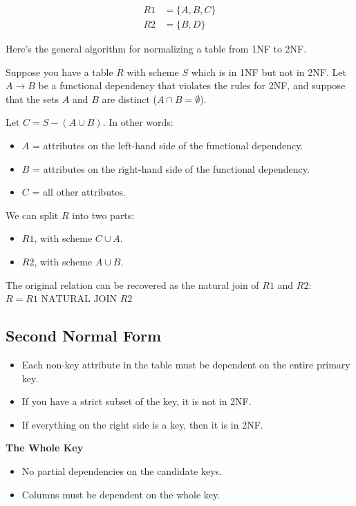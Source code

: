 \documentclass{article}
\begin{document}
\begin{align*}
    R1 & = \{A, B, C\} \\
    R2 & = \{B, D\}
\end{align*}

Here's the general algorithm for normalizing a table from 1NF to 2NF.

Suppose you have a table $R$ with scheme $S$ which is in 1NF but not in 2NF.
Let $A \rightarrow B$ be a functional dependency that violates the rules for
2NF, and suppose that the sets $A$ and $B$ are distinct ($A \cap B =
    \emptyset$).

Let $C = S - (A \cup B)$. In other words:
\begin{itemize}
    \item $A$ = attributes on the left-hand side of the functional dependency.
    \item $B$ = attributes on the right-hand side of the functional dependency.
    \item $C$ = all other attributes.
\end{itemize}

We can split $R$ into two parts:
\begin{itemize}
    \item $R1$, with scheme $C \cup A$.
    \item $R2$, with scheme $A \cup B$.
\end{itemize}

The original relation can be recovered as the natural join of $R1$ and $R2$: $R
    = R1 \text{ NATURAL JOIN } R2$

\subsection{Second Normal Form}
\begin{itemize}
    \item Each non-key attribute in the table must be dependent on the entire primary
          key.
    \item If you have a strict subset of the key, it is not in 2NF.
    \item If everything on the right side is a key, then it is in 2NF.
\end{itemize}

\textbf{The Whole Key}
\begin{itemize}
    \item No partial dependencies on the candidate keys.
    \item Columns must be dependent on the whole key.
\end{itemize}
\end{document}
